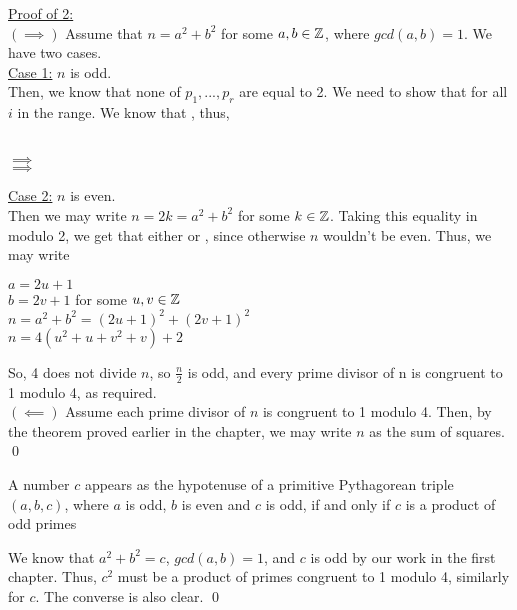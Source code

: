 \documentclass[../main.tex]{subfiles}
\begin{document}
\begin{pf}[Cont.]
    \underline{Proof of 2:} \\
    $(\implies)$ Assume that $n=a^2+b^2$ for some $a,b \in \mathbb{Z}$, where $gcd(a,b)=1$. We have two cases. \\
    \underline{Case 1:} $n$ is odd. \\
    Then, we know that none of $p_1,...,p_r$ are equal to 2. We need to show that  for all $i$ in the range. We know that , thus,
    \begin{center}
         \\
        $\implies$  \\
        $\implies$ 
    \end{center}
    \underline{Case 2:} $n$ is even. \\ 
    Then we may write $n=2k=a^2+b^2$ for some $k \in \mathbb{Z}$. Taking this equality in modulo 2, we get that either  or , since otherwise $n$ wouldn't be even. Thus, we may write
    \begin{center}
        $a=2u+1$ \\
        $b=2v+1$ for some $u,v \in \mathbb{Z}$ \\
        $n=a^2+b^2=(2u+1)^2+(2v+1)^2$ \\
        $n=4(u^2+u+v^2+v)+2$
    \end{center}
    So, 4 does not divide $n$, so $\tfrac{n}{2}$ is odd, and every prime divisor of n is congruent to 1 modulo 4, as required. \\
    $(\impliedby)$ Assume each prime divisor of $n$ is congruent to 1 modulo 4. Then, by the theorem proved earlier in the chapter, we may write $n$ as the sum of squares. \qed
    \end{pf}
    
\begin{thm}
    A number $c$ appears as the hypotenuse of a primitive Pythagorean triple $(a,b,c)$, where $a$ is odd, $b$ is even and $c$ is odd, if and only if $c$ is a product of odd primes 
\end{thm}
\begin{pf}
    We know that $a^2+b^2=c$, $gcd(a,b)=1$, and $c$ is odd by our work in the first chapter. Thus, $c^2$ must be a product of primes congruent to 1 modulo 4, similarly for $c$. The converse is also clear. \qed
\end{pf}
\end{document}
